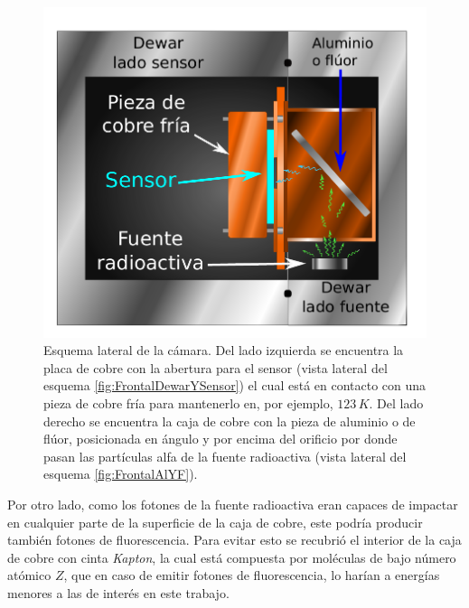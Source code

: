 \begin{figure}%
    \centering
    \includegraphics[scale=0.7]{Figs/LateralDewar.pdf}
    \caption{Esquema lateral de la cámara. Del lado izquierda se encuentra la placa de cobre con la abertura para el sensor (vista lateral del esquema \ref{fig:FrontalDewarYSensor}) el cual está en contacto con una pieza de cobre fría para mantenerlo en, por ejemplo, $123\,\si{K}$. Del lado derecho se encuentra la caja de cobre con la pieza de aluminio o de flúor, posicionada en ángulo y por encima del orificio por donde pasan las partículas alfa de la fuente radioactiva (vista lateral del esquema \ref{fig:FrontalAlYF}).}
    \label{fig:LateralDewar}
\end{figure}
Por otro lado, como los fotones de la fuente radioactiva eran capaces de impactar en cualquier parte de la superficie de la caja de cobre, este podría producir también fotones de fluorescencia. Para evitar esto se recubrió el interior de la caja de cobre con cinta \textit{Kapton}, la cual está compuesta por moléculas de bajo número atómico $Z$, que en caso de emitir fotones de fluorescencia, lo harían a energías menores a las de interés en este trabajo.


